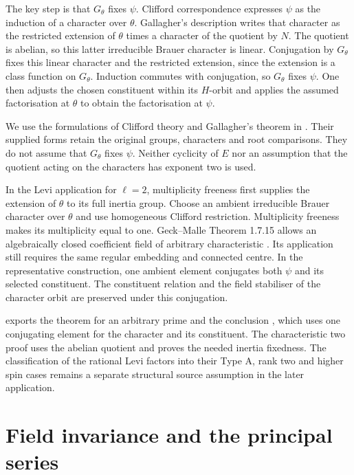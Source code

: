 The key step is that $G_\theta$ fixes $\psi$. Clifford correspondence
expresses $\psi$ as the induction of a character over $\theta$.
Gallagher's description writes that character as the restricted
extension of $\theta$ times a character of the quotient by $N$.
The quotient is abelian, so this latter irreducible Brauer character is
linear. Conjugation by $G_\theta$ fixes this linear character and the restricted extension, since the extension is a class function on $G_\theta$. Induction commutes with conjugation, so $G_\theta$ fixes $\psi$. One then adjusts
the chosen constituent within its $H$-orbit and applies the assumed
factorisation at $\theta$ to obtain the factorisation at $\psi$.

We use the formulations of Clifford theory and Gallagher's theorem in
\cite[Corollary~8.7, Theorem~8.9 and Corollary~8.20]{Navarro1998}. Their supplied
forms retain the original groups, characters and root comparisons.
They do not assume that $G_\theta$ fixes $\psi$. Neither cyclicity of
$E$ nor an assumption that the quotient acting on the characters has
exponent two is used.

In the Levi application for $\ell=2$, multiplicity freeness first supplies
the extension of $\theta$ to its full inertia group. Choose an
ambient irreducible Brauer character over $\theta$ and use homogeneous
Clifford restriction. Multiplicity freeness makes its multiplicity
equal to one. Geck--Malle Theorem 1.7.15 allows an algebraically closed
coefficient field of arbitrary characteristic
\cite{GeckMalle2020}. Its application still requires the same
regular embedding and connected centre. In the representative
construction, one ambient element conjugates both $\psi$ and its
selected constituent. The constituent relation and the field stabiliser
of the character orbit are preserved under this conjugation.

\begin{implementation}
 exports the theorem 
for an arbitrary prime and the conclusion , which
uses one conjugating element for the character and its constituent.
The characteristic two proof
uses the abelian quotient and proves the needed inertia fixedness.
The classification of the rational Levi factors into their Type A,
rank two and higher spin cases remains a separate structural source
assumption in the later application.
\end{implementation}

\section{Field invariance and the principal series}

